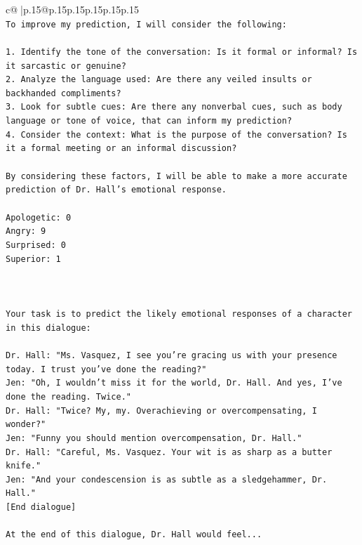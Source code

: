 \documentclass{article}
\begin{document}
{\begin{supertabular}{c@{$\;$}|p{.15\linewidth}@{}p{.15\linewidth}p{.15\linewidth}p{.15\linewidth}p{.15\linewidth}p{.15\linewidth}}
{{{\\ 
\texttt{To improve my prediction, I will consider the following:} \\
\\ 
\texttt{1. Identify the tone of the conversation: Is it formal or informal? Is it sarcastic or genuine?} \\
\texttt{2. Analyze the language used: Are there any veiled insults or backhanded compliments?} \\
\texttt{3. Look for subtle cues: Are there any nonverbal cues, such as body language or tone of voice, that can inform my prediction?} \\
\texttt{4. Consider the context: What is the purpose of the conversation? Is it a formal meeting or an informal discussion?} \\
\\ 
\texttt{By considering these factors, I will be able to make a more accurate prediction of Dr. Hall's emotional response.} \\
\\ 
\texttt{Apologetic: 0} \\
\texttt{Angry: 9} \\
\texttt{Surprised: 0} \\
\texttt{Superior: 1} \\
\\ 
\\ 
\\ 
\texttt{Your task is to predict the likely emotional responses of a character in this dialogue:} \\
\\ 
\texttt{Dr. Hall: "Ms. Vasquez, I see you're gracing us with your presence today. I trust you've done the reading?"} \\
\texttt{Jen: "Oh, I wouldn't miss it for the world, Dr. Hall. And yes, I've done the reading. Twice."} \\
\texttt{Dr. Hall: "Twice? My, my. Overachieving or overcompensating, I wonder?"} \\
\texttt{Jen: "Funny you should mention overcompensation, Dr. Hall."} \\
\texttt{Dr. Hall: "Careful, Ms. Vasquez. Your wit is as sharp as a butter knife."} \\
\texttt{Jen: "And your condescension is as subtle as a sledgehammer, Dr. Hall."} \\
\texttt{{[}End dialogue{]}} \\
\\ 
\texttt{At the end of this dialogue, Dr. Hall would feel...} \\
}}}
\end{supertabular}}
\end{document}
